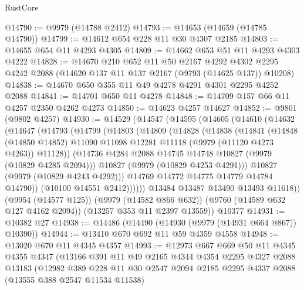\begin{lexlean}{RustCore}
\begin{coremodule}
@14790 := @9979 (@14788 @2412)
@14793 := @14653 (@14659 (@14785 @14790))
@14799 := @14612 @654 @228 @11 @30 @4307 @2185
@14803 := @14655 @654 @11 @4293 @4305
@14809 := @14662 @653 @51 @11 @4293 @4303 @4222
@14828 := @14670
    @210
    @652
    @11
    @50
    @2167
    @4292
    @4302
    @2295
    @4242
    @2088
    (@14620 @137 @11 @137 @2167 (@9793 (@14625 @137)) @10208)
@14838 := @14670 @650 @355 @11 @49 @4278 @4291 @4301 @2295 @4252 @2088
@14841 := @14701 @650 @11 @4278
@14848 := @14709 @157 @66 @11 @4257 @2350 @4262 @4273
@14850 := @14623 @4257 @14627
@14852 := @9801 (@9802 @4257)
@14930 := @14529
    (@14547
      (@14595
        (@14605
          (@14610
            (@14632
              (@14647
                (@14793
                  (@14799
                    (@14803
                      (@14809
                        (@14828
                          (@14838
                            (@14841
                              (@14848
                                (@14850 @14852)
                                @11090
                                @11098
                                @12281
                                @11118
                                (@9979 (@11120 @4273 @4263))
                                @11128))
                            (@14736 @4284 @2088 @14745 @14748 @10827 (@9979 (@10829 @4285 @2094)))
                            @10827
                            (@9979 (@10829 @4253 @4291)))
                          @10827
                          (@9979 (@10829 @4243 @4292)))
                        @14769
                        @14772
                        @14775
                        @14779
                        @14784
                        @14790))
                    (@10100 @14551 @2412))))))
          @13484
          @13487
          @13490
          @13493
          @11618))
      (@9954 (@14577 @125))
      (@9979 (@14582 @866 @632))
      (@9760 (@14589 @632 @127 @4162 @2094))
      (@13257 @353 @11 @2397 @13559))
    @10377
@14931 := @10382 @27
@14938 := @14486 (@14490 (@14930 (@9979 (@14931 @664 @867)) @10390))
@14944 := @13410 @670 @692 @11 @59 @4359 @4558
@14948 := @13020 @670 @11 @4345 @4357
@14993 := @12973
    @667
    @669
    @50
    @11
    @4345
    @4355
    @4347
    (@13166
      @391
      @11
      @49
      @2165
      @4344
      @4354
      @2295
      @4327
      @2088
      @13183
      (@12982
        @389
        @228
        @11
        @30
        @2547
        @2094
        @2185
        @2295
        @4337
        @2088
        (@13555 @388 @2547 @11534 @11538)

\end{coremodule}
\end{lexlean}
